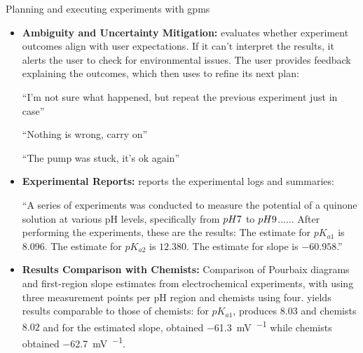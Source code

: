 \begin{examplebox}[label={example:chemcrow_organa}]{Planning and executing experiments with \glspl{gpm}}
\begin{itemize}
    : What is the setup of the lab environment? What hardware and reagents are present?
    
    User: I have a \SI{2}{\milli\molar} solution of the quinone......
    
    : Can you provide an example of how to run the experiment? 
    
    User: Add \SI{2}{\milli\liter} of quinone......

    : What is the expected outcome of the example experiment? 
    
    User: The pH of the solution is expected ......
    
    : How many experiments are we planning to run in total? 
    
    User: 6
    
    : Ok, thank you! I will start the experiment......

    \item \textbf{Ambiguity and Uncertainty Mitigation:} 
     evaluates whether experiment outcomes align with user expectations. If it can’t interpret the results, it alerts the user to check for environmental issues. The user provides feedback explaining the outcomes, which  then uses to refine its next plan:
    
    \enquote{I’m not sure what happened, but repeat the previous experiment just in case}
    
    \enquote{Nothing is wrong, carry on}

    \enquote{The pump was stuck, it’s ok again}
    
    
    \item \textbf{Experimental Reports:} 
     reports the experimental logs and summaries:
    
    \enquote{A series of experiments was conducted to measure the potential of a quinone solution at various pH levels, specifically from $pH \space 7$ to $pH \space 9$......
    After performing the experiments, these are the results:
    The estimate for $pK_{a1}$ is $8.096$.
    The estimate for $pK_{a2}$ is $12.380$.
    The estimate for slope is $-60.958$.}

    \item \textbf{Results Comparison with Chemists:} Comparison of Pourbaix diagrams and first-region slope estimates from electrochemical experiments, with  using three measurement points per pH region and chemists using four.  yields results comparable to those of chemists: for $pK_{a1}$,  produces $8.03$ and chemists $8.02$ and for the estimated slope,  obtained \SI[per-mode=symbol]{-61.3}{\milli\volt\per\pH} while chemists obtained \SI[per-mode=symbol]{-62.7}{\milli\volt\per\pH}.

\end{itemize}

\end{examplebox}

